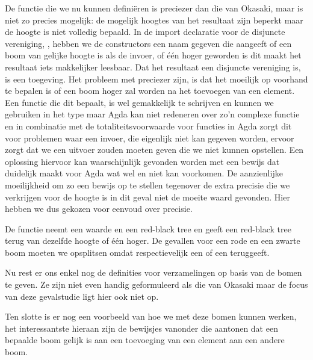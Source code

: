 De  functie die we nu kunnen definiëren is preciezer dan die van
Okasaki, maar is niet zo precies mogelijk: de mogelijk hoogtes van het
resultaat zijn beperkt maar de hoogte is niet volledig bepaald. In de import
declaratie voor de disjuncte vereniging, , hebben we de constructors
een naam gegeven die aangeeft of een boom van gelijke hoogte is als de invoer,
 of één hoger geworden is  dit maakt het resultaat iets
makkelijker leesbaar. Dat het resultaat een disjuncte vereniging is, is een
toegeving. Het probleem met preciezer zijn, is dat het moeilijk op voorhand te
bepalen is of een boom hoger zal worden na het toevoegen van een element. Een
functie die dit bepaalt, is wel gemakkelijk te schrijven en kunnen we gebruiken
in het type maar Agda kan niet redeneren over zo'n complexe functie en in
combinatie met de totaliteitsvoorwaarde voor functies in Agda zorgt dit voor
problemen waar een invoer, die eigenlijk niet kan gegeven worden, ervoor zorgt
dat we een uitvoer zouden moeten geven die we niet kunnen opstellen. Een
oplossing hiervoor kan waarschijnlijk gevonden worden met een bewijs dat
duidelijk maakt voor Agda wat wel en niet kan voorkomen. De aanzienlijke
moeilijkheid om zo een bewijs op te stellen tegenover de extra precisie die we
verkrijgen voor de hoogte is in dit geval niet de moeite waard gevonden. Hier
hebben we dus gekozen voor eenvoud over precisie.


De  functie neemt een waarde en een red-black tree en geeft een
red-black tree terug van dezelfde hoogte of één hoger. De gevallen voor een
rode en een zwarte boom moeten we opsplitsen omdat  respectievelijk
een  of een  teruggeeft.

Nu rest er ons enkel nog de definities voor verzamelingen op basis van de bomen
te geven. Ze zijn niet even handig geformuleerd als die van Okasaki maar de
focus van deze gevalstudie ligt hier ook niet op.


Ten slotte is er nog een voorbeeld van hoe we met deze bomen kunnen werken, het
interessantste hieraan zijn de bewijsjes vanonder die aantonen dat een bepaalde
boom gelijk is aan een toevoeging van een element aan een andere boom.




